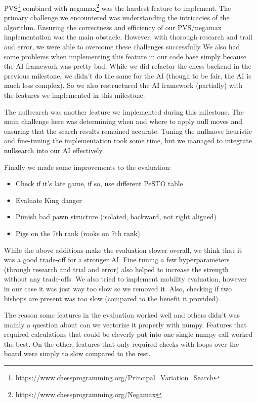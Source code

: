 PVS\footnote{https://www.chessprogramming.org/Principal\_Variation\_Search}
combined with
negamax\footnote{https://www.chessprogramming.org/Negamax}
was the hardest feature to implement.
The primary challenge we encountered was understanding the intricacies of the algorithm.
Ensuring the correctness and efficiency of our PVS/negamax implementation
was the main obstacle.
However, with thorough research and trail and error,
we were able to overcome these challenges successfully
We also had some problems when implementing this feature in our code base simply because the AI framework was pretty bad.
While we did refactor the chess backend in the previous milestone,
we didn't do the same for the AI (though to be fair, the AI is much less complex).
So we also restructured the AI framework (partially) with the features we implemented in this milestone.

The nullsearch was another feature we implemented during this milestone.
The main challenge here was determining when and where to apply null moves
and ensuring that the search results remained accurate.
Tuning the nullmove heuristic and fine-tuning the implementation took some time,
but we managed to integrate nullsearch into our AI effectively.

Finally we made some improvements to the evaluation:

\begin{itemize}
  \item{Check if it's late game, if so, use different PeSTO table}
  \item{Evaluate King danger}
  \item{Punish bad pawn structure (isolated, backward, not right aligned)}
  \item{Pigs on the 7th rank (rooks on 7th rank)}
\end{itemize}

While the above additions make the evaluation slower overall,
we think that it was a good trade-off for a stronger AI.
Fine tuning a few hyperparameters (through research and trial and error)
also helped to increase the strength without any trade-offs.
We also tried to implement mobility evaluation,
however in our case it was just way too slow so we removed it.
Also, checking if two bishops are present was too slow
(compared to the benefit it provided).

The reason some features in the evaluation worked well
and others didn't was mainly a question about can we vectorize it properly with numpy.
Features that required calculations that could
be cleverly put into one single numpy call worked the best.
On the other, features that only required checks
with loops over the board were simply to slow compared to the rest.
